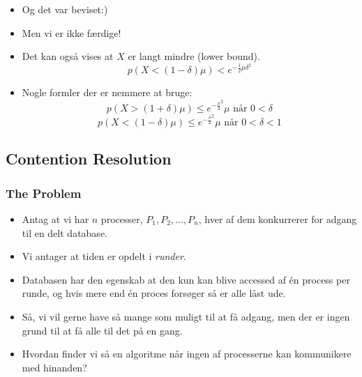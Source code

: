 \documentclass{beamer}
\begin{document}
\begin{frame}[allowframebreaks]
\begin{itemize}
\item Og det var beviset:)
\item Men vi er ikke færdige!
\item Det kan også vises at $X$ er langt mindre (lower bound). \[ p(X < (1 - \delta) \mu) < e^{- \frac{1}{2}\mu \delta^{2}} \]
\item Nogle formler der er nemmere at bruge: \[ p(X > (1 + \delta) \mu) \leq e^{- \frac{\delta}{3}^{2}} \mu \text{ når } 0 < \delta \]
  \[ p(X < (1- \delta) \mu ) \leq e^{- \frac{\delta}{2}^{2}}\mu \text{ når } 0 < \delta < 1 \]
\end{itemize}
\end{frame}

\subsection{Contention Resolution}
\label{subsec:label}

\begin{frame}[allowframebreaks]
  \frametitle{The Problem}
 \begin{itemize}
 \item Antag at vi har $n$ processer, $P_{1}, P_{2}, \ldots, P_{n}$, hver af dem konkurrerer for adgang til en delt database. 
 \item Vi antager at tiden er opdelt i \textit{runder}. 
 \item Databasen har den egenskab at den kun kan blive accessed af én process per runde, og hvis mere end én proces forsøger så er alle låst ude.
 \item Så, vi vil gerne have så mange som muligt til at få adgang, men der er ingen grund til at få alle til det på en gang. 
 \item Hvordan finder vi så en algoritme når ingen af processerne kan kommunikere med hinanden? 
 \end{itemize} 
\end{frame}
\end{document}
